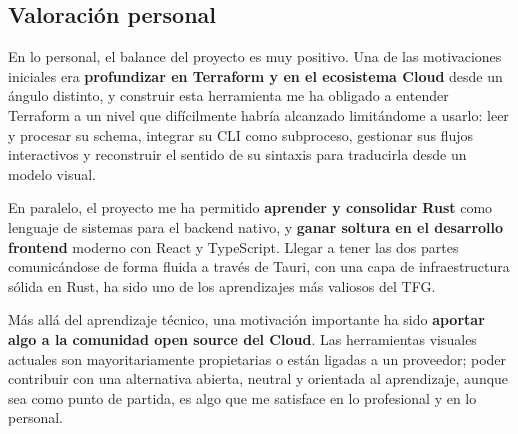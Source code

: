 \documentclass{article}
\begin{document}
{        \subsection{Valoración personal}
        \justify
        En lo personal, el balance del proyecto es muy positivo. Una de las
        motivaciones iniciales era \textbf{profundizar en Terraform y en el
        ecosistema Cloud} desde un ángulo distinto, y
        construir esta herramienta me ha obligado a entender Terraform a un
        nivel que difícilmente habría alcanzado limitándome a usarlo: leer y
        procesar su schema, integrar su CLI como subproceso, gestionar sus
        flujos interactivos y reconstruir el sentido de su sintaxis para
        traducirla desde un modelo visual.

        \justify
        En paralelo, el proyecto me ha permitido \textbf{aprender y consolidar
        Rust} como lenguaje de sistemas para el backend nativo, y \textbf{ganar
        soltura en el desarrollo frontend} moderno con React y TypeScript.
        Llegar a tener las dos partes comunicándose de forma fluida a través de
        Tauri, con una capa de infraestructura sólida en Rust, ha sido uno de
        los aprendizajes más valiosos del TFG.

        \justify
        Más allá del aprendizaje técnico, una motivación importante ha sido
        \textbf{aportar algo a la comunidad open source del Cloud}. Las
        herramientas visuales actuales son mayoritariamente propietarias o
        están ligadas a un proveedor; poder contribuir con una alternativa
        abierta, neutral y orientada al aprendizaje, aunque sea como punto de
        partida, es algo que me satisface en lo profesional y en lo personal.
    }

    \newpage
    \printbibliography
\end{document}

